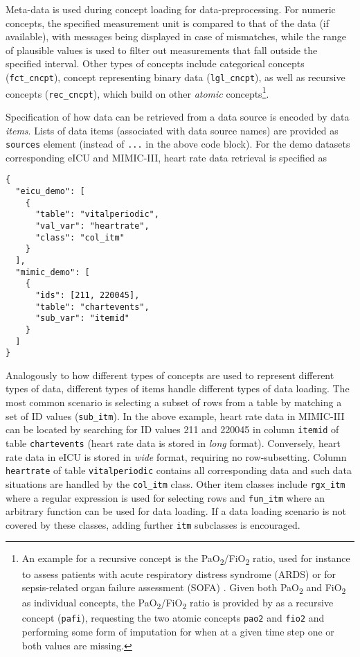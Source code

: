 \documentclass[
  notitle]{jss}
\begin{document}
Meta-data is used during concept loading for data-preprocessing. For
numeric concepts, the specified measurement unit is compared to that of
the data (if available), with messages being displayed in case of
mismatches, while the range of plausible values is used to filter out
measurements that fall outside the specified interval. Other types of
concepts include categorical concepts (\texttt{fct\_cncpt}), concept
representing binary data (\texttt{lgl\_cncpt}), as well as recursive
concepts (\texttt{rec\_cncpt}), which build on other \emph{atomic}
concepts\footnote{An example for a recursive concept is the
  PaO\textsubscript{2}/FiO\textsubscript{2} ratio, used for instance to
  assess patients with acute respiratory distress syndrome (ARDS) or for
  sepsis-related organ failure assessment (SOFA)
  \citep{villar2013, vincent1996}. Given both PaO\textsubscript{2} and
  FiO\textsubscript{2} as individual concepts, the
  PaO\textsubscript{2}/FiO\textsubscript{2} ratio is provided by
   as a recursive concept (\texttt{pafi}), requesting the two
  atomic concepts \texttt{pao2} and \texttt{fio2} and performing some
  form of imputation for when at a given time step one or both values
  are missing.}.

Specification of how data can be retrieved from a data source is encoded
by data \emph{items}. Lists of data items (associated with data source
names) are provided as \texttt{sources} element (instead of \texttt{...}
in the above code block). For the demo datasets corresponding eICU and
MIMIC-III, heart rate data retrieval is specified as

\begin{verbatim}
{
  "eicu_demo": [
    {
      "table": "vitalperiodic",
      "val_var": "heartrate",
      "class": "col_itm"
    }
  ],
  "mimic_demo": [
    {
      "ids": [211, 220045],
      "table": "chartevents",
      "sub_var": "itemid"
    }
  ]
}
\end{verbatim}

Analogously to how different types of concepts are used to represent
different types of data, different types of items handle different types
of data loading. The most common scenario is selecting a subset of rows
from a table by matching a set of ID values (\texttt{sub\_itm}). In the
above example, heart rate data in MIMIC-III can be located by searching
for ID values 211 and 220045 in column \texttt{itemid} of table
\texttt{chartevents} (heart rate data is stored in \emph{long} format).
Conversely, heart rate data in eICU is stored in \emph{wide} format,
requiring no row-subsetting. Column \texttt{heartrate} of table
\texttt{vitalperiodic} contains all corresponding data and such data
situations are handled by the \texttt{col\_itm} class. Other item
classes include \texttt{rgx\_itm} where a regular expression is used for
selecting rows and \texttt{fun\_itm} where an arbitrary function can be
used for data loading. If a data loading scenario is not covered by
these classes, adding further \texttt{itm} subclasses is encouraged.
\end{document}
